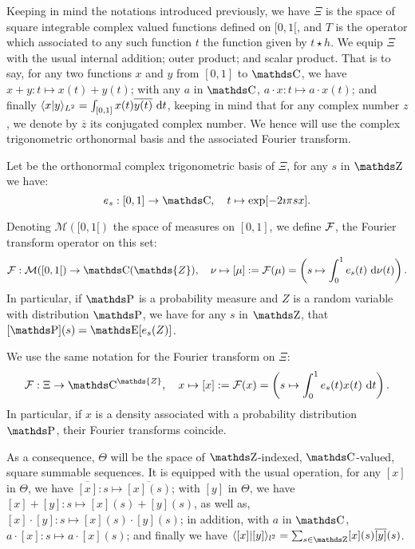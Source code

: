 Keeping in mind the notations introduced previously, we have $\Xi$ is the space of square integrable complex valued functions defined on $[0, 1[$, and $T$ is the operator which associated to any such function $t$ the function given by $t \star h$.
We equip $\Xi$ with the usual internal addition; outer product; and scalar product.
That is to say, for any two functions $x$ and $y$ from $[0, 1]$ to $\C$, we have $x + y : t \mapsto x(t) + y(t)$; with any $a$ in $\C$, $a \cdot x: t \mapsto a \cdot x(t)$; and finally $\langle x \vert y \rangle_{L^{2}} = \int_{[0, 1]} x(t) \overline{y(t)} \operatorname{\, d \!} t$, keeping in mind that for any complex number $z$, we denote by $\overline{z}$ its conjugated complex number.
We hence will use the complex trigonometric orthonormal basis and the associated Fourier transform.

\begin{nota}\label{NOTA_INTRO_CIRCULARDECONVOLUTION_FOURIERBASIS}
Let be the orthonormal complex trigonometric basis of $\Xi$, for any $s$ in $\Z$ we have:
\[e_{s} : [0, 1] \rightarrow \C, \quad t \mapsto \exp[- 2 \imath \pi s x].\]

Denoting $\mathcal{M}([0, 1[)$ the space of measures on $[0, 1]$, we define $\operatorname{\mathcal{F}}$, the Fourier transform operator on this set:
\[\fourier : \mathcal{M}([0, 1[) \rightarrow \C(\mathds{Z}), \quad \nu \mapsto [\mu] := \fourier(\mu) = \left(s \mapsto \int\nolimits_{0}^{1} e_{s}(t) \d\nu(t)\right).\]
In particular, if $\P$ is a probability measure and $Z$ is a random variable with distribution $\P$, we have for any $s$ in $\Z$, that $[\P](s) = \E[e_{s}(Z)]$.

We use the same notation for the Fourier transform on $\Xi$:
\[\fourier : \Xi \rightarrow \C^{\mathds{Z}}, \quad x \mapsto [x] := \fourier(x) = \left(s \mapsto \int\nolimits_{0}^{1} e_{s}(t) x(t) \d t\right).\]
In particular, if $x$ is a density associated with a probability distribution $\P$, their Fourier transforms coincide.
\assEnd
\end{nota}

As a consequence, $\Theta$ will be the space of $\Z$-indexed, $\C$-valued, square summable sequences.
It is equipped with the usual operation, for any $[x]$ in $\Theta$, we have $\overline{[x]}: s \mapsto \overline{[x](s)}$; with $[y]$ in $\Theta$, we have $[x] + [y] : s \mapsto [x](s) + [y](s)$, as well as, $[x] \cdot [y] : s \mapsto [x](s) \cdot [y](s)$; in addition, with $a$ in $\C$, $a\cdot[x]: s \mapsto a \cdot [x](s)$; and finally we have $\langle [x] \vert [y] \rangle_{l^{2}} = \sum_{s\in \Z} [x](s) \overline{[y]}(s)$.

